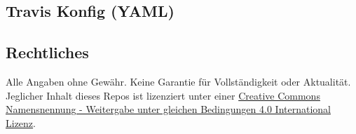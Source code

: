 \documentclass[]{article}
\begin{document}
\subsection{Travis Konfig (YAML)}\label{travis-konfig-yaml}




\subsection{Rechtliches}\label{rechtliches}

Alle Angaben ohne Gewähr. Keine Garantie für Vollständigkeit oder
Aktualität. Jeglicher Inhalt dieses Repos ist lizenziert unter einer
\href{http://creativecommons.org/licenses/by-sa/4.0/}{Creative Commons
Namensnennung - Weitergabe unter gleichen Bedingungen 4.0 International
Lizenz}.
\end{document}
